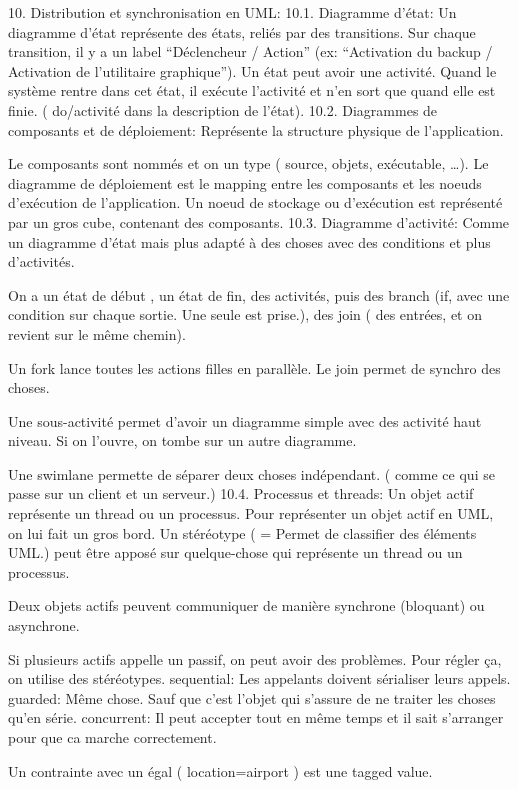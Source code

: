 10. Distribution et synchronisation en UML:
10.1. Diagramme d’état:
Un diagramme d’état représente des états, reliés par des transitions.
Sur chaque transition, il y a un label “Déclencheur / Action”
(ex: “Activation du backup / Activation de l’utilitaire graphique”).
Un état peut avoir une activité. Quand le système rentre dans cet état, il exécute l’activité et n’en sort que quand elle est finie. ( do/activité dans la description de l’état).
10.2. Diagrammes de composants et de déploiement:
Représente la structure physique de l’application.

Le composants sont nommés et on un type ( source, objets, exécutable, …).
Le diagramme de déploiement est le mapping entre les composants et les noeuds d’exécution de l’application.
Un noeud de stockage ou d’exécution est représenté par un gros cube, contenant des composants.
10.3. Diagramme d’activité:
Comme un diagramme d’état mais plus adapté à des choses avec des conditions et plus d’activités.

On a un état de début , un état de fin, des activités, puis des branch (if, avec une condition sur chaque sortie. Une seule est prise.), des join ( des entrées, et on revient sur le même chemin).

Un fork lance toutes les actions filles en parallèle. Le join permet de synchro des choses.

Une sous-activité permet d’avoir un diagramme simple avec des activité haut niveau. Si on l’ouvre, on tombe sur un autre diagramme.

Une swimlane permette de séparer deux choses indépendant. ( comme ce qui se passe sur un client et un serveur.)
10.4. Processus et threads:
Un objet actif représente un thread ou un processus.
Pour représenter un objet actif en UML, on lui fait un gros bord.
Un stéréotype ( = Permet de classifier des éléments UML.) peut être apposé sur quelque-chose qui représente un thread ou un processus.

Deux objets actifs peuvent communiquer de manière synchrone (bloquant) ou asynchrone.

Si plusieurs actifs appelle un passif, on peut avoir des problèmes. Pour régler ça, on utilise des stéréotypes.
sequential: Les appelants doivent sérialiser leurs appels.
guarded: Même chose. Sauf que c’est l’objet qui s’assure de ne traiter les choses qu’en série.
concurrent: Il peut accepter tout en même temps et il sait s’arranger pour que ca marche correctement.

Un contrainte avec un égal ( {location=airport} ) est une tagged value.